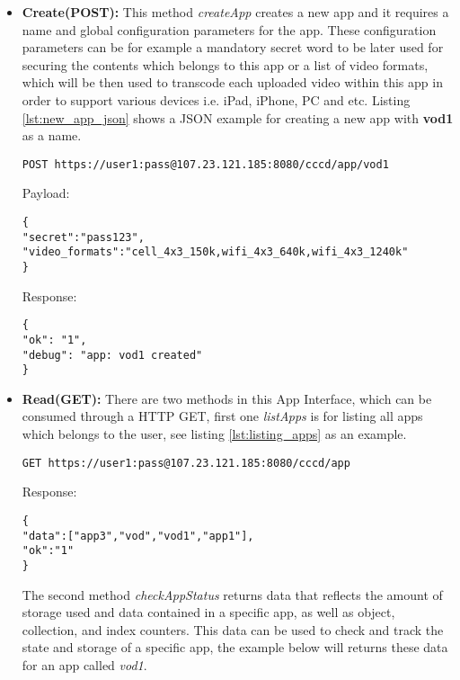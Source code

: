\begin{itemize}
\item \textbf{Create(POST):} This method \textit{createApp} creates a new app and it requires a name and global configuration parameters for the app. These configuration parameters can be for example a mandatory secret word to be later used for securing the contents which belongs to this app or a list of video formats, which will be then used to transcode each uploaded video within this app in order to support various devices i.e. iPad, iPhone, PC and etc. Listing \ref{lst:new_app_json} shows a JSON example for creating a new app with \textbf{vod1} as a name.

\begin{code}
\begin{verbatim}
POST https://user1:pass@107.23.121.185:8080/cccd/app/vod1
\end{verbatim}
Payload:
\begin{verbatim}
{
"secret":"pass123",
"video_formats":"cell_4x3_150k,wifi_4x3_640k,wifi_4x3_1240k"
}
\end{verbatim}
Response:
\begin{verbatim}
{
"ok": "1",
"debug": "app: vod1 created"
}
\end{verbatim}
\caption{Creating a new app}
\label{lst:new_app_json}
\end{code}

\item \textbf{Read(GET):} There are two methods in this App Interface, which can be consumed through a HTTP GET, first one \textit{listApps} is for listing all apps which belongs to the user, see listing \ref{lst:listing_apps} as an example. 

\begin{code}
\begin{verbatim}
GET https://user1:pass@107.23.121.185:8080/cccd/app
\end{verbatim}
Response:
\begin{verbatim}
{
"data":["app3","vod","vod1","app1"],
"ok":"1"
}
\end{verbatim}
\caption{Listing all apps which belong to a user}
\label{lst:listing_apps}
\end{code}


The second method \textit{checkAppStatus} returns data that reflects the amount of storage used and data contained in a specific app, as well as object, collection, and index counters. This data can be used to check and track the state and storage of a specific app, the example below will returns these data for an app called \textit{vod1}.


\end{itemize}
